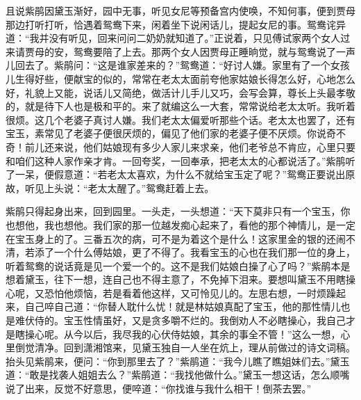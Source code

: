 \begin{parag}
    且说紫鹃因黛玉渐好，园中无事，听见女尼等预备宫内使唤，不知何事，便到贾母那边打听打听，恰遇着鸳鸯下来，闲着坐下说闲话儿，提起女尼的事。鸳鸯诧异道：“我并没有听见，回来问问二奶奶就知道了。”正说着，只见傅试家两个女人过来请贾母的安，鸳鸯要陪了上去。那两个女人因贾母正睡晌觉，就与鸳鸯说了一声儿回去了。紫鹃问：“这是谁家差来的？”鸳鸯道：“好讨人嫌。家里有了一个女孩儿生得好些，便献宝的似的，常常在老太太面前夸他家姑娘长得怎么好，心地怎么好，礼貌上又能，说话儿又简绝，做活计儿手儿又巧，会写会算，尊长上头最孝敬的，就是待下人也是极和平的。来了就编这么一大套，常常说给老太太听。我听着很烦。这几个老婆子真讨人嫌。我们老太太偏爱听那些个话。老太太也罢了，还有宝玉，素常见了老婆子便很厌烦的，偏见了他们家的老婆子便不厌烦。你说奇不奇！前儿还来说，他们姑娘现有多少人家儿来求亲，他们老爷总不肯应，心里只要和咱们这种人家作亲才肯。一回夸奖，一回奉承，把老太太的心都说活了。”紫鹃听了一呆，便假意道：“若老太太喜欢，为什么不就给宝玉定了呢？”鸳鸯正要说出原故，听见上头说：“老太太醒了。”鸳鸯赶着上去。
\end{parag}


\begin{parag}
    紫鹃只得起身出来，回到园里。一头走，一头想道：“天下莫非只有一个宝玉，你也想他，我也想他。我们家的那一位越发痴心起来了，看他的那个神情儿，是一定在宝玉身上的了。三番五次的病，可不是为着这个是什么！这家里金的银的还闹不清，若添了一个什么傅姑娘，更了不得了。我看宝玉的心也在我们那一位的身上，听着鸳鸯的说话竟是见一个爱一个的。这不是我们姑娘白操了心了吗？”紫鹃本是想着黛玉，往下一想，连自己也不得主意了，不免掉下泪来。要想叫黛玉不用瞎操心呢，又恐怕他烦恼，若是看着他这样，又可怜见儿的。左思右想，一时烦躁起来，自己啐自己道：“你替人耽什么忧！就是林姑娘真配了宝玉，他的那性情儿也是难伏侍的。宝玉性情虽好，又是贪多嚼不烂的。我倒劝人不必瞎操心，我自己才是瞎操心呢。从今以后，我尽我的心伏侍姑娘，其余的事全不管！”这么一想，心里倒觉清净。回到潇湘馆来，见黛玉独自一人坐在炕上，理从前做过的诗文词稿。抬头见紫鹃来，便问：“你到那里去了？”紫鹃道：“我今儿瞧了瞧姐妹们去。”黛玉道：“敢是找袭人姐姐去么？”紫鹃道：“我找他做什么。”黛玉一想这话，怎么顺嘴说了出来，反觉不好意思，便啐道：“你找谁与我什么相干！倒茶去罢。”
\end{parag}



